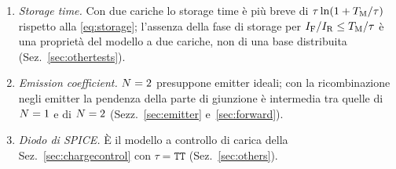 \documentclass[10pt,a4paper]{scrartcl}
\let\newcommand\pdvaluedefine
\newcommand{\IF}{I_\mathrm{F}}
\newcommand{\IR}{I_\mathrm{R}}
\newcommand{\TM}{T_\mathrm{M}}
\newcommand{\Nem}{N}                          %
\begin{document}
\begin{enumerate}
\item \emph{Storage time.} Con due cariche lo storage time è più breve di $\tau\ln(1+\TM/\tau)$ rispetto alla \eqref{eq:storage}; l'assenza della fase di storage per $\IF/\IR \leq \TM/\tau$ è una proprietà del modello a due cariche, non di una base distribuita (Sez.~\ref{sec:othertests}).
\item \emph{Emission coefficient.} $\Nem = 2$ presuppone emitter ideali; con la ricombinazione negli emitter la pendenza della parte di giunzione è intermedia tra quelle di $\Nem = 1$ e di $\Nem = 2$ (Sezz.~\ref{sec:emitter} e~\ref{sec:forward}).
\item \emph{Diodo di SPICE.} È il modello a controllo di carica della Sez.~\ref{sec:chargecontrol} con $\tau = \texttt{TT}$ (Sez.~\ref{sec:others}).
\end{enumerate}
\end{document}
